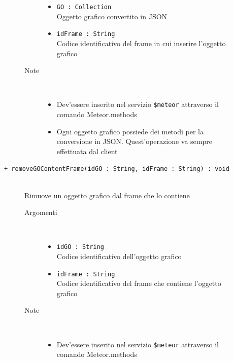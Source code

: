 \begin{description}
\begin{description}
\begin{description}
\begin{itemize}
					\item \texttt{GO : Collection			} \hfill \\
					Oggetto grafico convertito in JSON
					\item \texttt{idFrame : String		} \hfill \\
					Codice identificativo del frame in cui inserire l'oggetto grafico
					
					
				\end{itemize}
			\item[Note] \hfill \\
			\begin{itemize}
					\item Dev'essere inserito nel servizio \texttt{\$meteor} attraverso il comando Meteor.methods
					\item Ogni oggetto grafico possiede dei metodi per la conversione in JSON. Quest'operazione va sempre effettuata dal client
				\end{itemize}
		\end{description}
	\end{description}
	
	\begin{description}
		\item[\texttt{+ removeGOContentFrame(idGO : String, idFrame : String) : void			}] \hfill \\
			Rimuove un oggetto grafico dal frame che lo contiene
			
		\begin{description}
			\item[Argomenti] \hfill \\
				\begin{itemize}
				
					\item \texttt{idGO : String		} \hfill \\
					Codice identificativo dell'oggetto grafico
					\item \texttt{idFrame : String		} \hfill \\
					Codice identificativo del frame che contiene l'oggetto grafico
					
				\end{itemize}
			\item[Note] \hfill \\
			\begin{itemize}
					\item Dev'essere inserito nel servizio \texttt{\$meteor} attraverso il comando Meteor.methods
				\end{itemize}
		\end{description}
	\end{description}
	

\end{description}
